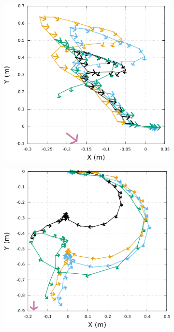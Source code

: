 \begin{figure}[htb]
\begin{subfigure}{0.28\paperwidth}
    \end{subfigure}
    \newline
    \begin{subfigure}{0.28\paperwidth}
        \centering
        \includegraphics[type=pdf,ext=.pdf,read=.pdf,width=1.0\linewidth]{../plot/OdometryCMAES/ordersTraj7}
    \end{subfigure}
    \begin{subfigure}{0.28\paperwidth}
        \centering
        \includegraphics[type=pdf,ext=.pdf,read=.pdf,width=1.0\linewidth]{../plot/OdometryCMAES/ordersTraj8}

\end{subfigure}
\end{figure}
